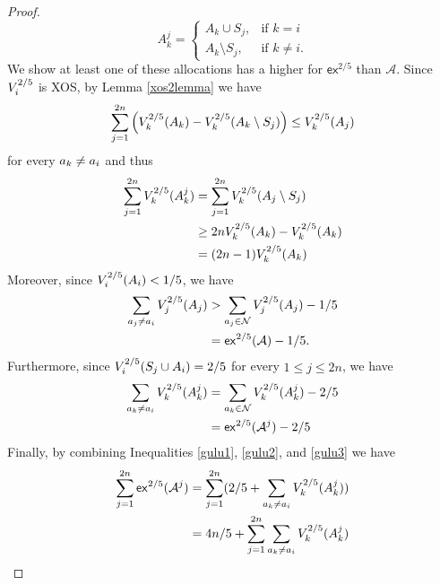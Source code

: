 \begin{proof}
$$A^j_k =
\begin{cases}
A_k \cup S_j, & \text{if }k = i \\
A_k \setminus S_j, & \text{if }k \neq i.
\end{cases}$$
We show at least one of these allocations has a higher for $\mathsf{ex}^{2/5}$ than $\mathcal{A}$.
Since $V^{2/5}_i$ is XOS, by Lemma \ref{xos2lemma} we have
\begin{equation*}
\sum_{j=1}^{2n}\Big(V^{2/5}_k(A_k) - V^{2/5}_k(A_k \setminus S_j)\Big) \leq V^{2/5}_k(A_j)
\end{equation*}
for every $a_k \neq a_i$ and thus
\begin{equation}\label{gulu1}
\begin{split}
\sum_{j=1}^{2n} V^{2/5}_k(A^j_k) &= \sum_{j=1}^{2n} V^{2/5}_k(A_j \setminus S_j)\\
 &\geq 2n V^{2/5}_k(A_k) - V^{2/5}_k(A_k)\\
&= (2n-1)V^{2/5}_k(A_k)
\end{split}
\end{equation}
Moreover, since $V^{2/5}_i(A_i) < 1/5$, we have
\begin{equation}\label{gulu2}
\begin{split}
\sum_{a_j \neq a_i} V_j^{2/5}(A_j) & > \sum_{a_j \in \mathcal{N}} V_j^{2/5}(A_j) - 1/5\\
&=\mathsf{ex}^{2/5}(\mathcal{A})-1/5.
\end{split}
\end{equation}
Furthermore, since $V_i^{2/5}(S_j \cup A_i) = 2/5$ for every $1 \leq j \leq 2n$, we have
\begin{equation}\label{gulu3}
\begin{split}
\sum_{a_k \neq a_i} V^{2/5}_k(A^j_k) &= \sum_{a_k \in \mathcal{N}} V^{2/5}_k(A^j_k) - 2/5\\
&= \mathsf{ex}^{2/5}(\mathcal{A}^j) - 2/5
\end{split}
\end{equation}
Finally, by combining Inequalities \eqref{gulu1}, \eqref{gulu2}, and \eqref{gulu3} we have
\begin{equation*}
	\begin{split}
	\sum_{j=1}^{2n} \mathsf{ex}^{2/5}(\mathcal{A}^j) & = \sum_{j=1}^{2n}(2/5 +\sum_{\agent_k \neq \agent_i} \valu^{2/5}_k(A^j_k)) \\
	& = 4n/5 + \sum_{j=1}^{2n}\sum_{\agent_k \neq \agent_i} \valu^{2/5}_k(A^j_k)\\  

\end{split}
\end{equation*}
\end{proof}
